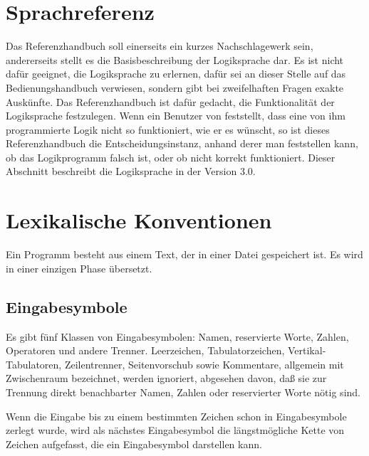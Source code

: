\pagestyle{headings}

\chapter{Sprachreferenz}\label{cha:sprachreferenz}
\label{eins}

Das Referenzhandbuch soll einerseits ein kurzes
Nachschlagewerk sein, andererseits stellt es die Basisbeschreibung
der Logiksprache \mutabor{} dar. Es ist nicht dafür geeignet, die
Logiksprache zu erlernen, dafür sei an dieser Stelle auf das
Bedienungshandbuch verwiesen, sondern gibt bei zweifelhaften
Fragen exakte Auskünfte. Das Referenzhandbuch ist dafür gedacht,
die Funktionalität der Logiksprache festzulegen. Wenn ein Benutzer
von \mutabor{} feststellt, dass eine von ihm programmierte Logik
nicht so funktioniert, wie er es wünscht, so ist dieses
Referenzhandbuch die Entscheidungsinstanz, anhand derer man
feststellen kann, ob das Logikprogramm falsch ist, oder ob
\mutabor{} nicht korrekt funktioniert.
Dieser Abschnitt beschreibt die Logiksprache \mutabor{} in der Version 3.0.


\chapter{Lexikalische Konventionen}\label{cha:lexik-konv}
\label{zwei}

Ein Programm besteht aus einem Text, der in einer Datei gespeichert ist.
Es wird in einer einzigen Phase übersetzt.

\section{Eingabesymbole}\label{sec:eingabesymbole}
\label{zweieins}

Es  gibt fünf Klassen von Eingabesymbolen:
Namen,  reservierte  Worte,
Zahlen,
 Operatoren  und  andere
Trenner.  Leerzeichen, Tabulatorzeichen,
Vertikal-Tabulatoren,
Zeilentrenner, Seitenvorschub
sowie Kommentare,
allgemein mit Zwischenraum  bezeichnet,  werden
ignoriert,  abgesehen davon,  da\ss{} sie zur Trennung direkt
benachbarter Namen, Zahlen oder reservierter Worte n\"otig sind.

Wenn  die Eingabe bis zu einem bestimmten Zeichen schon in Eingabesymbole
zerlegt  wurde,  wird als n\"achstes
Eingabesymbol die l\"angstm\"ogliche  Kette
von Zeichen aufgefasst, die ein Eingabesymbol darstellen kann.


